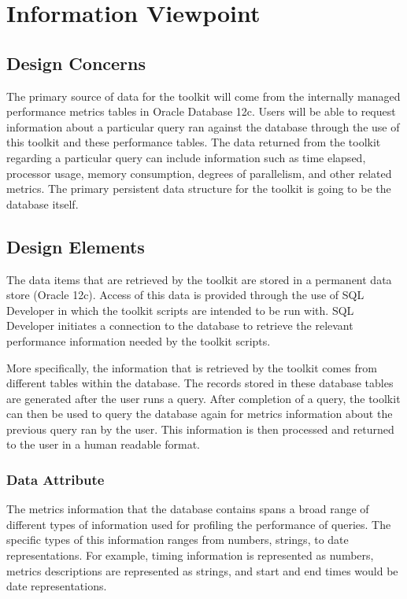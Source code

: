 \documentclass[draftclsnofoot, onecolumn, compsoc, 10pt]{IEEEtran}
\begin{document}

\section{Information Viewpoint}
\subsection{Design Concerns}
The primary source of data for the toolkit will come from the internally managed performance metrics tables in Oracle Database 12c.
Users will be able to request information about a particular query ran against the database through the use of this toolkit and these performance tables.
The data returned from the toolkit regarding a particular query can include information such as time elapsed, processor usage, memory consumption, degrees of parallelism, and other related metrics.
The primary persistent data structure for the toolkit is going to be the database itself.

\subsection{Design Elements}
The data items that are retrieved by the toolkit are stored in a permanent data store (Oracle 12c).
Access of this data is provided through the use of SQL Developer in which the toolkit scripts are intended to be run with.
SQL Developer initiates a connection to the database to retrieve the relevant performance information needed by the toolkit scripts. 

More specifically, the information that is retrieved by the toolkit comes from different tables within the database.
The records stored in these database tables are generated after the user runs a query.
After completion of a query, the toolkit can then be used to query the database again for metrics information about the previous query ran by the user.
This information is then processed and returned to the user in a human readable format.

\subsubsection{Data Attribute}
The metrics information that the database contains spans a broad range of different types of information used for profiling the performance of queries.
The specific types of this information ranges from numbers, strings, to date representations.
For example, timing information is represented as numbers, metrics descriptions are represented as strings, and start and end times would be date representations.
\end{document}
